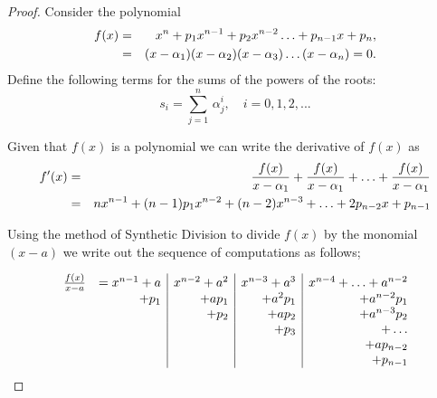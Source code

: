 \begin{proof}
Consider the polynomial 
\begin{eqnarray*} 
f(x) &=& x^n + p_1 x^{n-1} + p_2 x^{n-2} \hdots + p_{n-1}x + p_n, \cr
      &=& (x - \alpha_1)(x- \alpha_2)(x- \alpha_3) \hdots (x- \alpha_n) = 0.
\end{eqnarray*}
Define the following terms for the sums of the powers of the roots: 
\[s_i = \sum_{j=1}^n\, \alpha_j^i, \quad i = 0, 1, 2, ... \]

Given that $f(x)$ is a polynomial we can write the derivative of $f(x)$ as 
\begin{eqnarray*}
 f'(x) &=& {f(x) \over x- \alpha_1} + {f(x) \over x- \alpha_1} + \hdots + {f(x) \over x- \alpha_1} \cr 
&=& nx^{n-1} + (n-1) p_1 x^{n-2} + (n-2)x^{n-3} + \hdots + 2p_{n-2} x + p_{n-1}
\end{eqnarray*}

Using the method of Synthetic Division to divide $f(x)$ by the monomial $(x-a)$ we write out the sequence of computations as follows;

\[
\begin{array}{l r | r | r | r}
{f(x)\over x - a } & =  x^{n-1} + a   &  x^{n-2} + a^2&  x^{n-3} + a^3&x^{n-4} + \hdots + a^{n-2} \\
                          &                + p_1&        + a p_1   &     + a^2 p_1    & +  a^{n-2} p_1   \\
                           &                         &       + p_2     &      + a p_2     &  +  a^{n-3} p_2  \\
                           &                         &                      &     + p_3           &  + \hdots            \\
                           &                         &                      &                         &  + a p_{n-2}      \\
                           &                         &                      &                         &  + p_{n-1}         \\
\end{array}
\]


\end{proof}
